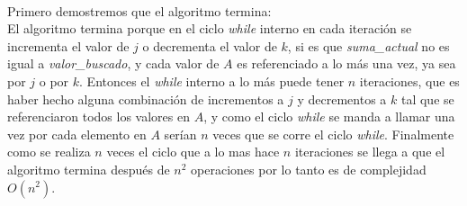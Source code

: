 \documentclass[12pt]{article}
\begin{document}
\paragraph{}
Primero demostremos que el algoritmo termina:\\
El algoritmo termina porque en el ciclo \textit{while} interno en cada iteración se incrementa el valor de $j$ o decrementa el valor de $k$, si es que \textit{suma\_actual} no es igual a \textit{valor\_buscado}, y cada valor de $A$ es referenciado a lo más una vez, ya sea por $j$ o por $k$. Entonces el \textit{while} interno a lo más puede tener $n$ iteraciones, que es haber hecho alguna combinación de incrementos a $j$ y decrementos a $k$ tal que se referenciaron todos los valores en $A$, y como el ciclo \textit{while} se manda a llamar una vez por cada elemento en $A$ serían $n$ veces que se corre el ciclo \textit{while}. Finalmente como se realiza $n$ veces el ciclo que a lo mas hace $n$ iteraciones se llega a que el algoritmo termina después de $n^{2}$ operaciones por lo tanto es de complejidad $O(n^{2})$.
\end{document}
